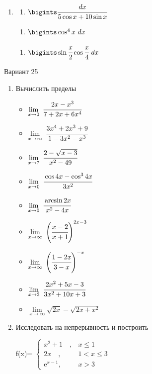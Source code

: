 \documentclass{article}
\begin{document}
\begin{multicols}{2}
\begin{enumerate}[label=\Roman*.]
	\item
	\begin{multicols}{3}
		\begin{enumerate}[label=\arabic*.]
			\setlength\itemsep{1em}
			\item $\bigints\cfrac{dx}{5\cos x + 10 \sin x}$
		\end{enumerate}
		\vfill\null\columnbreak
		\begin{enumerate}[label=\arabic*., start=2]
			\setlength\itemsep{1em}
			\item $\bigints\cos^4x\ dx$
		\end{enumerate}
		\vfill\null\columnbreak
		\begin{enumerate}[label=\arabic*., start=3]
			\setlength\itemsep{1em}
			\item $\bigints\sin\cfrac{x}{2}\cos\cfrac{x}{4}\ dx$
		\end{enumerate}
		\vfill\null\columnbreak
	\end{multicols}
\end{enumerate}

\vfill\null\columnbreak

\centerline{Вариант 25}

\begin{enumerate}[label=\arabic*.]
	\item Вычислить пределы
	\begin{multicols}{3}
		\begin{itemize}[label=""]
			\item $\lim\limits_{x \to 0}\ \cfrac{2x - x^3}{7+2x+6x^4}$
			\item $\lim\limits_{x \to \infty}\ \cfrac{3x^4 + 2x^3 + 9}{1-3x^2-x^3}$
			\item $\lim\limits_{x \to 7}\ \cfrac{2-\sqrt{x-3}}{x^2-49}$
				\vfill\null\columnbreak
			\item $\lim\limits_{x \to 0}\ \cfrac{\cos 4x - \cos^3 4x}{3x^2}$
			\item $\lim\limits_{x \to 0}\ \cfrac{\arcsin 2x}{x^2-4x}$
			\item $\lim\limits_{x \to \infty}\ \Bigg(\cfrac{x-2}{x+1}\Bigg)^{2x-3}$
				\vfill\null\columnbreak
			\item $\lim\limits_{x \to \infty}\ \Bigg(\cfrac{1-2x}{3-x}\Bigg)^{-x}$
			\item $\lim\limits_{x \to 3}\ \cfrac{2x^2+5x-3}{3x^2+10x+3}$
			\item $\lim\limits_{x \to \infty} \sqrt{2x}-\sqrt{2x+x^2}$
				\vfill\null\columnbreak
		\end{itemize}
	\end{multicols}
	\vspace{-5mm}
	\item Исследовать на непрерывность и построить
	\begin{multicols}{3}
		f(x)=
		$\begin{cases}
		x^2 + 1 \quad, & x \leq 1\\
		2x \quad, & 1 < x \leq 3 \\
		\mbox{e}^{x-1}, & x > 3
		\end{cases}$
		\vfill\null\columnbreak
		\vfill\null\columnbreak
	\end{multicols}
	

\end{enumerate}
\end{multicols}
\end{document}

